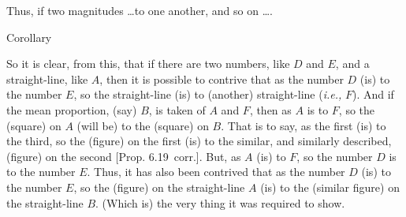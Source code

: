 \begin{Parallel}{}{}
{Thus,  if two magnitudes \ldots to one another, and so on \ldots.\\

\begin{center}
{\large Corollary}
\end{center}\vspace*{-7pt}

So it is clear, from this, that if there are two numbers, like $D$ and $E$, and
a straight-line, like $A$, then it is possible to contrive that as the number $D$ (is)
to the number $E$, so the straight-line (is) to (another) straight-line ({\em i.e.,} $F$). And if the mean proportion, (say) $B$,  is taken of $A$ and $F$, 
then as $A$ is to $F$, so the (square) on $A$ (will be) to the (square)
on $B$. That is to say, as the first (is) to the third, so the
(figure) on the first (is) to the similar, and similarly described, (figure) on the second [Prop. 6.19~corr.]. But, as $A$ (is) to
$F$, so the number $D$ is to the number $E$. Thus, it has also been contrived
that as the number $D$ (is) to the number $E$, so the (figure) on the
straight-line $A$ (is) to the (similar figure) on the straight-line $B$. (Which is)
the very thing it was required to show.}
\end{Parallel}

